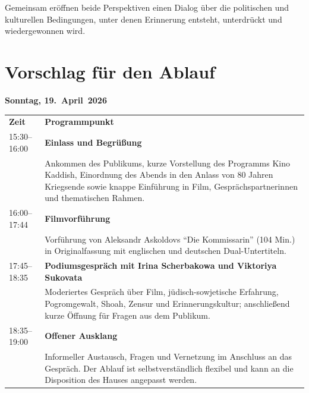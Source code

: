 \documentclass[11pt,a4paper]{article}
\begin{document}
Gemeinsam er\"offnen beide Perspektiven einen Dialog \"uber die politischen und kulturellen Bedingungen, unter denen Erinnerung entsteht, unterdr\"uckt und wiedergewonnen wird.

\section*{Vorschlag f\"ur den Ablauf}

\noindent\textbf{Sonntag, 19.~April~2026}

\small
\renewcommand{\arraystretch}{1.08}
\begin{tabularx}{\textwidth}{@{}p{3cm}X@{}}
\textbf{Zeit} & \textbf{Programmpunkt} \\
15:30--16:00 & \textbf{Einlass und Begr\"u{\ss}ung} \\
& Ankommen des Publikums, kurze Vorstellung des Programms Kino Kaddish, Einordnung des Abends in den Anlass von 80 Jahren Kriegsende sowie knappe Einf\"uhrung in Film, Gespr\"achspartnerinnen und thematischen Rahmen. \\
16:00--17:44 & \textbf{Filmvorf\"uhrung} \\
& Vorf\"uhrung von Aleksandr Askoldovs \enquote{Die Kommissarin} (104 Min.) in Originalfassung mit englischen und deutschen Dual-Untertiteln. \\
17:45--18:35 & \textbf{Podiumsgespr\"ach mit Irina Scherbakowa und Viktoriya Sukovata} \\
& Moderiertes Gespr\"ach \"uber Film, j\"udisch-sowjetische Erfahrung, Pogromgewalt, Shoah, Zensur und Erinnerungskultur; anschlie{\ss}end kurze \"Offnung f\"ur Fragen aus dem Publikum. \\
18:35--19:00 & \textbf{Offener Ausklang} \\
& Informeller Austausch, Fragen und Vernetzung im Anschluss an das Gespr\"ach. Der Ablauf ist selbstverst\"andlich flexibel und kann an die Disposition des Hauses angepasst werden. \\
\end{tabularx}
\end{document}
